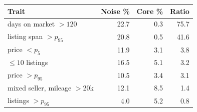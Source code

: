 \begin{tabular}{@{}lrrr@{}}
\toprule
Trait & Noise \% & Core \% & Ratio \\
\midrule
days on market $>120$ & 22.7 & 0.3 & 75.7 \\
listing span $>p_{95}$ & 20.8 & 0.5 & 41.6 \\
price $<p_5$ & 11.9 & 3.1 & 3.8 \\
$\leq 10$ listings & 16.5 & 5.1 & 3.2 \\
price $>p_{95}$ & 10.5 & 3.4 & 3.1 \\
mixed seller, mileage $>$20k & 12.1 & 8.5 & 1.4 \\
listings $>p_{95}$ & 4.0 & 5.2 & 0.8 \\
\bottomrule
\end{tabular}
